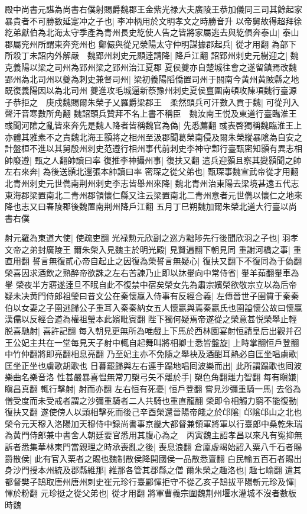 殿中尚書元諶為尚書右僕射賜爵魏郡王金紫光禄大夫廣陵王恭加儀同三司其餘起家暴貴者不可勝數延寔冲之子也|{
	李冲柄用於文明孝文之時勝音升}
以帝舅故得超拜徐紇弟獻伯為北海太守季產為青州長史紇使人告之皆將家屬逃去與紇俱奔泰山|{
	泰山郡屬兖州所謂東奔兖州也}
鄭儼與從兄滎陽太守仲明謀據郡起兵|{
	從才用翻}
為部下所殺丁未詔内外解嚴　魏郢州刺史元顯逹請降|{
	降戶江翻}
詔郢州刺史元樹迎之|{
	魏克義陽以梁之司州為郢州梁之郢州治江夏郡}
夏侯夔亦自楚城往會之遂留鎮焉改魏郢州為北司州以夔為刺史兼督司州|{
	梁初義陽䧟僑置司州于關南今黄州黄陂縣之地既復義陽因以為北司州}
夔進攻毛城逼新蔡豫州刺史夏侯亶圍南頓攻陳項魏行臺源子恭拒之　庚戍魏賜爾朱榮子乂羅爵梁郡王　柔然頭兵可汗數入貢于魏|{
	可從刋入聲汗音寒數所角翻}
魏詔頭兵贊拜不名上書不稱臣　魏汝南王悦及東道行臺臨淮王彧聞河隂之亂皆來奔先是魏人降者皆稱魏官為偽|{
	先悉薦翻}
彧表啓獨稱魏臨淮王上亦體其雅素不之責魏北海王顥將之相州至汲郡聞葛榮南侵及爾朱榮縱暴隂為自安之計盤桓不進以其舅殷州刺史范遵行相州事代前刺史李神守鄴行臺甄密知顥有異志相帥廢遵|{
	甄之人翻帥讀曰率}
復推李神攝州事|{
	復扶又翻}
遣兵迎顥且察其變顥聞之帥左右來奔|{
	為後送顥北還張本帥讀曰率}
密琛之從父弟也|{
	甄琛事魏宣武帝從才用翻}
北青州刺史元世儁南荆州刺史李志皆舉州來降|{
	魏北青州治東陽去梁境甚遠五代志東海郡梁置南北二青州郡領懷仁縣又注云梁置南北二青州意者元世儁以懷仁之地來降也志又曰春陵郡後魏置南荆州降戶江翻}
五月丁巳朔魏加爾朱榮北道大行臺以尚書右僕

射元羅為東道大使|{
	使疏吏翻}
光禄勲元欣副之巡方黜陟先行後聞欣羽之子也|{
	羽孝文帝之弟封廣陵王}
爾朱榮入見魏主於明光殿|{
	見賢遍翻下朝見同}
重謝河橋之事|{
	重直用翻}
誓言無復貳心帝自起止之因復為榮誓言無疑心|{
	復扶又翻下不復同為于偽翻}
榮喜因求酒飲之熟醉帝欲誅之左右苦諫乃止即以牀轝向中常侍省|{
	轝羊茹翻轝車為轝}
榮夜半方寤遂逹旦不眠自此不復禁中宿矣榮女先為肅宗嬪榮欲敬宗立以為后帝疑未决黄門侍郎祖瑩曰昔文公在秦懷嬴入侍事有反經合義|{
	左傳晉世子圉質于秦秦伯以女妻之子圉逃歸公子重耳入秦秦納女五人懷嬴與焉秦嬴氏也圉謚懷公故曰懷嬴漢儒以反經合道為權祖瑩本此嬪毗賓翻}
陛下獨何疑焉帝遂從之榮意甚悦榮舉止輕脱喜馳射|{
	喜許記翻}
每入朝見更無所為唯戲上下馬於西林園宴射恒請皇后出觀并召王公妃主共在一堂每見天子射中輒自起舞叫將相卿士悉皆盤旋|{
	上時掌翻恒戶登翻中竹仲翻將即亮翻相息亮翻}
乃至妃主亦不免隨之舉袂及酒酣耳熱必自匡坐唱虜歌|{
	匡坐正坐也虜歌胡歌也}
日暮罷歸與左右連手蹋地唱囘波樂而出|{
	此所謂蹋歌也囘波樂曲名樂音洛}
性甚嚴暴喜愠無常刀槊弓矢不離於手|{
	槊色角翻離力智翻}
每有瞋嫌|{
	瞋昌真翻}
輒行擊射|{
	射而亦翻}
左右恒有死憂|{
	恒戶登翻}
嘗見沙彌重騎一馬|{
	去俗為僧受度而未受戒者謂之沙彌重騎者二人共騎也重直龍翻}
榮即令相觸力窮不能復動|{
	復扶又翻}
遂使傍人以頭相擊死而後己辛酉榮還晉陽帝餞之於邙隂|{
	邙隂邙山之北也}
榮令元天穆入洛陽加天穆侍中録尚書事京畿大都督兼領軍將軍以行臺郎中桑乾朱瑞為黄門侍郎兼中書舍人朝廷要官悉用其腹心為之　丙寅魏主詔孝昌以來凡有寃抑無訴者悉集華林東門當親理之時承喪亂之後|{
	喪息浪翻}
倉廩虛竭始詔入粟八千石者賜爵散侯|{
	此有官入栗者之賜也魏制散侯降開國侯一品散悉亶翻}
白民輸五百石者賜出身沙門授本州統及郡縣維那|{
	維那各管其郡縣之僧}
爾朱榮之趣洛也|{
	趣七喻翻}
遣其都督樊子鵠取唐州唐州刺史崔元珍行臺酈惲拒守不從乙亥子鵠拔平陽斬元珍及惲|{
	惲於粉翻}
元珍挺之從父弟也|{
	從才用翻}
將軍曹義宗圍魏荆州堰水灌城不沒者數板時魏

